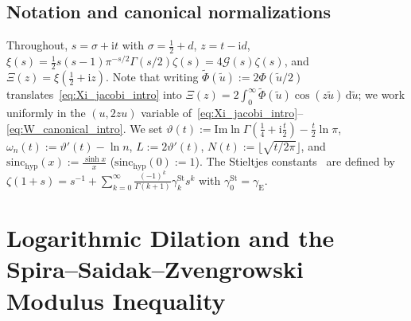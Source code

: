 \documentclass[11pt,reqno]{amsart}
\theoremstyle{definition}
\theoremstyle{remark}
\numberwithin{equation}{section}
\newcommand{\dd}{\mathrm{d}}
\newcommand{\ii}{\mathrm{i}}
\newcommand{\Ima}{\mathrm{Im}}
\newcommand{\sinchyp}{\mathrm{sinc}_{\mathrm{hyp}}}
\begin{document}
\subsection{Notation and canonical normalizations}\label{subsec:notation}

Throughout, $s = \sigma + \ii t$ with $\sigma = \frac{1}{2} + d$, $z = t - \ii d$, $\xi(s) = \frac{1}{2}s(s-1)\pi^{-s/2}\Gamma(s/2)\zeta(s) = 4\mathcal{G}(s)\zeta(s)$, and $\Xi(z) = \xi(\frac{1}{2} + \ii z)$. Note that writing $\widetilde{\Phi}(\tilde{u}) := 2\Phi(\tilde{u}/2)$ translates~\eqref{eq:Xi_jacobi_intro} into $\Xi(z) = 2\int_0^{\infty} \widetilde{\Phi}(\tilde{u})\cos(z\tilde{u})\,\dd\tilde{u}$; we work uniformly in the $(u, 2zu)$ variable of~\eqref{eq:Xi_jacobi_intro}--\eqref{eq:W_canonical_intro}. We set $\vartheta(t) := \Ima\ln\Gamma(\frac{1}{4} + \ii\frac{t}{2}) - \frac{t}{2}\ln\pi$, $\omega_n(t) := \vartheta'(t) - \ln n$, $L := 2\vartheta'(t)$, $N(t) := \lfloor\sqrt{t/2\pi}\rfloor$, and $\sinchyp(x) := \frac{\sinh x}{x}$ ($\sinchyp(0) := 1$). The Stieltjes constants~\cite{stieltjes1885} are defined by $\zeta(1+s) = s^{-1} + \sum_{k=0}^{\infty} \frac{(-1)^k}{\Gamma(k+1)}\gamma_k^{\mathrm{St}} s^k$ with $\gamma_0^{\mathrm{St}} = \gamma_{\mathrm{E}}$.

\section{Logarithmic Dilation and the Spira--Saidak--Zvengrowski Modulus Inequality}\label{sec:dilation}
\end{document}
